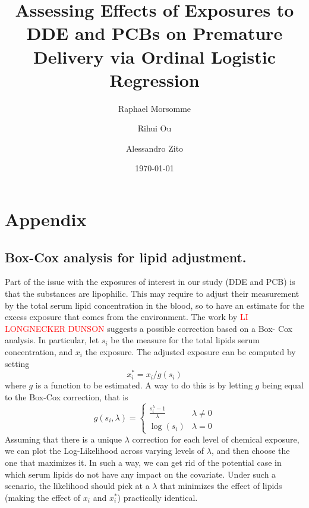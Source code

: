 \documentclass[wcp]{jmlr}%
\title[DDE and PCB effect on Premature delivery]{Assessing Effects of Exposures to DDE and PCBs on Premature Delivery via Ordinal Logistic Regression}	%
\author[Morsomme, Ou, Zito]{Raphael Morsomme \and Rihui Ou \and Alessandro Zito}
\date{\today} %
\newcommand\todo[1]{\textcolor{red}{#1}}
\begin{document}
\maketitle

\begin{abstract}

\end{abstract}


\newpage
\appendix
\section{Appendix}
\subsection{Box-Cox analysis for lipid adjustment.}
Part of the issue with the exposures of interest in our study (DDE and PCB) is that the substances are lipophilic. This may require to adjust their measurement by the total serum lipid concentration in the blood, so to have an estimate for the excess exposure that comes from the environment. The work by \todo{LI LONGNECKER DUNSON} suggests a possible correction based on a Box- Cox analysis. In particular, let $s_i$ be the measure for the total lipids serum concentration, and $x_i$ the exposure. The adjusted exposure can be computed by setting 
\begin{equation}
x_i^* = x_i/g(s_i)
\end{equation} 
where $g$ is a function to be estimated. A way to do this is by letting $g$ being equal to the Box-Cox correction, that is
\begin{equation}
g(s_i,\lambda) = 
\begin{cases} 
\frac{s_i^\lambda-1}{\lambda} & \lambda \neq 0 \\
\log(s_i) & \lambda =0 
\end{cases}
\end{equation}
Assuming that there is a unique $\lambda$ correction for each level of chemical exposure, we can plot the Log-Likelihood across varying levels of $\lambda$, and then choose the one that maximizes it. In such a way, we can get rid of the potential case in which serum lipids do not have any impact on the covariate. Under such a scenario, the likelihood should pick at a $\lambda$ that minimizes the effect of lipids (making the effect of $x_i$ and $x_i^*$) practically identical. 
\end{document}
